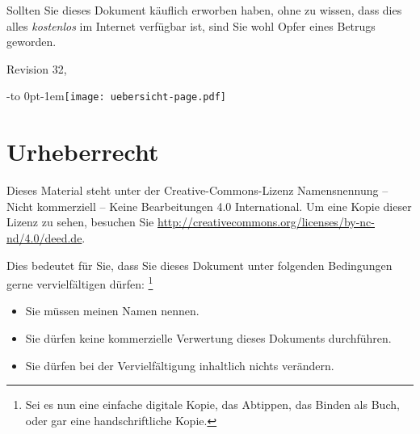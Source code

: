 \documentclass[english,ngerman,fontsize=9pt,intoc,index=totoc,refpage,listof=totoc,draft]{scrbook}
\numberwithin{equation}{section}
\newcommand{\blob}{\textcolor{black}{\rule[-2mm]{5mm}{5mm}}}
\newcommand{\blobctr}{\numexpr\value{part}+2\relax}
\newcommand{\rblob}{%
\AtBeginShipoutNext{\AtBeginShipoutUpperLeft{%
  \setlength{\unitlength}{10mm}%
  \put(%
    14.3,%
    -\blobctr%
  ){\blob}%
}}%
}
\newcommand{\lblob}{%
\AtBeginShipoutNext{\AtBeginShipoutUpperLeft{%
  \setlength{\unitlength}{10mm}%
  \put(%
    0,%
    -\blobctr%
  ){\blob}%
}}%
}
\renewcommand{\headrulewidth}{0pt}
\begin{document}
\vspace{4cm}
\begin{onehalfspace}
    \Large\sffamily
    Sollten Sie dieses Dokument käuflich erworben haben, ohne zu wissen, dass dies alles \textsl{kostenlos} im Internet verfügbar ist, sind Sie wohl Opfer eines Betrugs geworden.
\end{onehalfspace}

\vfill
\begin{flushright}
  Revision 32, \datemonthname\ \the\year
\end{flushright}

\clearpage

\thispagestyle{empty}
%
\ifthispageodd{}{\hbox{\ }\eject\thispagestyle{empty}}%
%
%
\noindent\kern-\parindent\vbox to 0pt{\kern-1em\texttt{[image: uebersicht-page.pdf]}}
\restoregeometry
\thispagestyle{empty}%
\clearpage



\chapter*{Urheberrecht}

\fancypagestyle{empty}{%
	\fancyhf{}
	\renewcommand{\headrulewidth}{0pt}
	\fancyhead[LE]{\lblob}
	\fancyhead[RO]{\rblob}
	\fancyfoot[C]{\ccbyncnd}
}
\thispagestyle{empty}
\hfil{\Huge\ccbyncnd}\hfil

\bigskip{}

Dieses Material steht unter der Creative-Commons-Lizenz Namensnennung -- Nicht kommerziell -- Keine Bearbeitungen 4.0 International.
Um eine Kopie dieser Lizenz zu sehen, besuchen Sie \url{http://creativecommons.org/licenses/by-nc-nd/4.0/deed.de}.

Dies bedeutet für Sie, dass Sie dieses Dokument unter folgenden Bedingungen gerne vervielfältigen dürfen:%
\footnote{Sei es nun eine einfache digitale Kopie, das Abtippen, das Binden als Buch, oder gar eine handschriftliche Kopie.}

\begin{itemize}
  \item Sie müssen meinen Namen nennen.
  \item Sie dürfen keine kommerzielle Verwertung dieses Dokuments durch\-führ\-en.
  \item Sie dürfen bei der Vervielfältigung inhaltlich nichts verändern.
\end{itemize}
\end{document}
